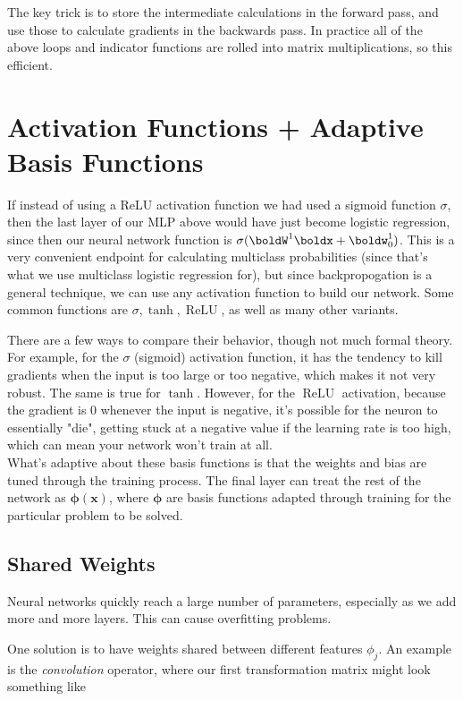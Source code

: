 \documentclass[12pt,letterpaper]{article}
\newcommand{\1}{\mathbbm{1}}
\newcommand{\on}{\operatorname}
\begin{document}
The key trick is to store the intermediate calculations in the forward pass, and use those to calculate gradients in the backwards pass. In practice all of the above loops and indicator functions are rolled into matrix multiplications, so this efficient.

\section{Activation Functions + Adaptive Basis Functions} \label{activation}
If instead of using a ReLU activation function we had used a sigmoid function $\sigma$, then the last layer of our MLP above would have just become logistic regression, since then our neural network function is $\sigma(\boldW^1 \boldx + \boldw_0^1)$. This is a very convenient endpoint for calculating multiclass probabilities (since that's what we use multiclass logistic regression for), but since backpropogation is a general technique, we can use any activation function to build our network. Some common functions are $\sigma, \tanh, \on{ReLU}$, as well as many other variants.

There are a few ways to compare their behavior, though not much formal theory. For example, for the $\sigma$ (sigmoid) activation function, it has the tendency to kill gradients when the input is too large or too negative, which makes it not very robust. The same is true for $\tanh$. However, for the $\on{ReLU}$ activation, because the gradient is 0 whenever the input is negative, it's possible for the neuron to essentially "die", getting stuck at a negative value if the learning rate is too high, which can mean your network won't train at all.\\

\noindent 
What's adaptive about these basis functions is that the weights and bias are tuned through the training process. The final layer can treat the rest of the network as $\boldsymbol{\phi}(\mathbf{x})$, where $\boldsymbol{\phi}$ are basis functions adapted through training for the particular problem to be solved.

\subsection{Shared Weights}

Neural networks quickly reach a large number of parameters, especially as we add more and more layers. This can cause overfitting problems.

One solution is to have weights shared between different features $\phi_j$. An example is the \emph{convolution} operator, where our first transformation matrix might look something like
\end{document}
